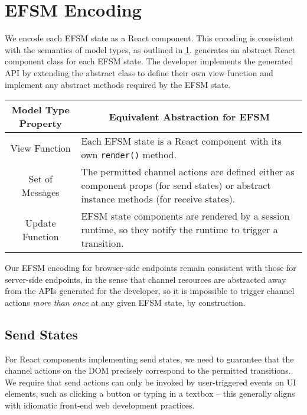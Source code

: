 \section{EFSM Encoding}
\label{section:reactefsm}

We encode each EFSM state as a React component.
This encoding is consistent with the semantics of model types,
as outlined in \cref{table:efsmmodeltypes}.
\reactcodegen generates an abstract React component class
for each EFSM state. The developer implements the generated API
by extending the abstract class to define their own
view function and implement any abstract methods
required by the EFSM state.

\renewcommand{\arraystretch}{1.5}
\begin{table}[!ht]
\centering
\begin{tabularx}{\linewidth}{||c|X||}
\hline
Model Type Property & \multicolumn{1}{c||}{Equivalent Abstraction for EFSM} \\
\hline\hline
View Function & 
Each EFSM state is a React component 
with its own \texttt{render()} method. \\ 
\hline
Set of Messages & The permitted channel actions are defined either as 
component props (for send states) 
or abstract instance methods (for receive states). \\
\hline
Update Function & EFSM state components are rendered by a session runtime,
so they notify the runtime to trigger a transition. \\
\hline
\end{tabularx}
\label{table:efsmmodeltypes}
\end{table}
\renewcommand{\arraystretch}{1}

Our EFSM encoding for browser-side endpoints remain
consistent with those for server-side endpoints, in the sense that
channel resources are abstracted away from the APIs generated
for the developer, so it is impossible to trigger
channel actions \textit{more than once} at any given EFSM state,
by construction.

\subsection{Send States}

For React components implementing send states,
we need to guarantee that the channel actions on the DOM
precisely correspond to the permitted transitions.
We require that send actions can only be invoked
by user-triggered events on UI elements, such as clicking a button or
typing in a textbox -- this generally aligns
with idiomatic front-end web development practices.

